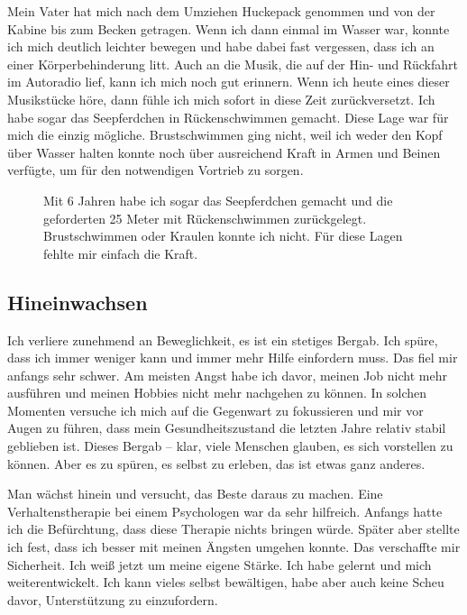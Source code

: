 \documentclass[fontsize=14pt,a4paper,headinclude,DIV=calc,automark]{scrbook}
\begin{document}
Mein Vater hat mich nach dem Umziehen Huckepack genommen und von der Kabine bis zum Becken getragen. Wenn ich dann einmal im Wasser war, konnte ich mich deutlich leichter bewegen und habe dabei fast vergessen, dass ich an einer Körperbehinderung litt. Auch an die Musik, die auf der Hin- und Rückfahrt im Autoradio lief, kann ich mich noch gut erinnern. Wenn ich heute eines dieser Musikstücke höre, dann fühle ich mich sofort in diese Zeit zurückversetzt. Ich habe sogar das Seepferdchen in Rückenschwimmen gemacht. Diese Lage war für mich die einzig mögliche. Brustschwimmen ging nicht, weil ich weder den Kopf über Wasser halten konnte noch über ausreichend Kraft in Armen und Beinen verfügte, um für den notwendigen Vortrieb zu sorgen.

\setlength{\fboxsep}{0pt}    %
\setlength{\fboxrule}{0.2pt} %
\begin{figure}[H]
    \centering
    \caption{Mit 6 Jahren habe ich sogar das Seepferdchen gemacht und die geforderten 25 Meter mit Rückenschwimmen zurückgelegt. Brustschwimmen oder Kraulen konnte ich nicht. Für diese Lagen fehlte mir einfach die Kraft.}
    \label{fig:seepferdchen}
\end{figure}

\subsection{Hineinwachsen}

Ich verliere zunehmend an Beweglichkeit, es ist ein stetiges Bergab. Ich spüre, dass ich immer weniger kann und immer mehr Hilfe einfordern muss. Das fiel mir anfangs sehr schwer. Am meisten Angst habe ich davor, meinen Job nicht mehr ausführen und meinen Hobbies nicht mehr nachgehen zu können. In solchen Momenten versuche ich mich auf die Gegenwart zu fokussieren und mir vor Augen zu führen, dass mein Gesundheitszustand die letzten Jahre relativ stabil geblieben ist. Dieses Bergab – klar, viele Menschen glauben, es sich vorstellen zu können. Aber es zu spüren, es selbst zu erleben, das ist etwas ganz anderes.

Man wächst hinein und versucht, das Beste daraus zu machen. Eine Verhaltenstherapie bei einem Psychologen war da sehr hilfreich. Anfangs hatte ich die Befürchtung, dass diese Therapie nichts bringen würde. Später aber stellte ich fest, dass ich besser mit meinen Ängsten umgehen konnte. Das verschaffte mir Sicherheit. Ich weiß jetzt um meine eigene Stärke. Ich habe gelernt und mich weiterentwickelt. Ich kann vieles selbst bewältigen, habe aber auch keine Scheu davor, Unterstützung zu einzufordern.
\end{document}

